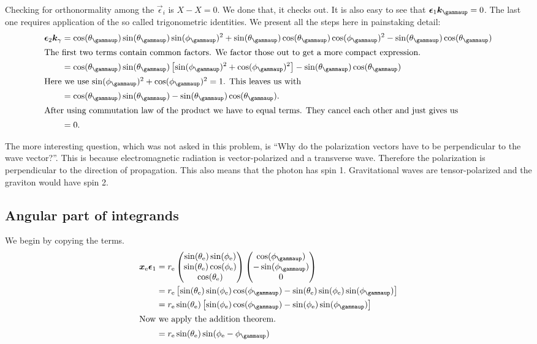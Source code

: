 \documentclass[11pt, english, fleqn, DIV=15, headinclude, BCOR=1.5cm]{scrartcl}
\begin{document}
Checking for orthonormality among the $\vec \epsilon_i$ is $X - X = 0$. We done
that, it checks out. It is also easy to see that $\vec \epsilon_1 \vec
k_\gammaup = 0$. The last one requires application of the so called
trigonometric identities. We present all the steps here in painstaking detail:
\begin{align*}
    \vec \epsilon_2 \vec k_\gamma
    &= \cos(\tg) \sin(\tg) \sin(\phg)^2 + \sin(\tg) \cos(\tg) \cos(\phg)^2 -
    \sin(\tg) \cos(\tg) \\
    \intertext{%
        The first two terms contain common factors. We factor those out to get
        a more compact expression.
    }
    &= \cos(\tg) \sin(\tg) \sbr{ \sin(\phg)^2 + \cos(\phg)^2} - \sin(\tg) \cos(\tg)
    \\
    \intertext{%
        Here we use $\sin(\phg)^2 + \cos(\phg)^2 = 1$. This leaves us with
    }
    &= \cos(\tg) \sin(\tg) - \sin(\tg) \cos(\tg). \\
    \intertext{%
        After using commutation law of the product we have to equal terms. They
        cancel each other and just gives us
    }
    &= 0.
\end{align*}

The more interesting question, which was not asked in this problem, is “Why do
the polarization vectors have to be perpendicular to the wave vector?”. This is
because electromagnetic radiation is vector-polarized and a transverse wave.
Therefore the polarization is perpendicular to the direction of propagation.
This also means that the photon has spin 1. Gravitational waves are
tensor-polarized and the graviton would have spin 2.

\subsection{Angular part of integrands}

We begin by copying the terms.
\begin{align*}
    \vec x_\text e \vec \epsilon_1
    &= r_\text e
    \begin{pmatrix}
        \sin(\te) \sin(\phe) \\
        \sin(\te) \cos(\phe) \\
        \cos(\te)
    \end{pmatrix}
    \begin{pmatrix}
        \cos(\phg) \\
        - \sin(\phg) \\
        0
    \end{pmatrix} \\
    &= r_\text e \sbr{
        \sin(\te) \sin(\phe) \cos(\phg) - \sin(\te) \sin(\phe) \sin(\phg)
    } \\
    &= r_\text e \sin(\te) \sbr{
        \sin(\phe) \cos(\phg) - \sin(\phe) \sin(\phg)
    } \\
    \intertext{%
        Now we apply the addition theorem.
    }
    &= r_\text e \sin(\te) \sin(\phe - \phg)
\end{align*}
\end{document}

